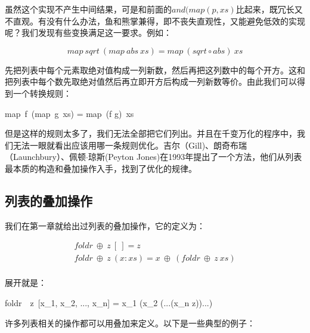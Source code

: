 \documentclass[b5paper]{ctexart}
\begin{document}
虽然这个实现不产生中间结果，可是和前面的$and(map(p, xs)$比起来，既冗长又不直观。有没有什么办法，鱼和熊掌兼得，即不丧失直观性，又能避免低效的实现呢？我们发现有些变换满足这一要求。例如：

\[
map\ sqrt\  (map\ abs\ xs) = map\ (sqrt \circ abs)\ xs
\]

先把列表中每个元素取绝对值构成一列新数，然后再把这列数中的每个开方。这和把列表中每个数先取绝对值然后再立即开方后构成一列新数等价。由此我们可以得到一个转换规则：

\be
map\ f\ (map\ g\ xs) = map\ (f \circ g)\ xs
\ee

但是这样的规则太多了，我们无法全部把它们列出。并且在千变万化的程序中，我们无法一眼就看出应该用哪一条规则优化。吉尔（Gill)、朗奇布瑞（Launchbury）、佩顿$\cdot$琼斯(Peyton Jones)在1993年提出了一个方法，他们从列表最本质的构造和叠加操作入手，找到了优化的规律。

\subsection{列表的叠加操作}

我们在第一章就给出过列表的叠加操作，它的定义为：

\[
\begin{array}{l}
foldr\ \oplus\ z\ [\ ] = z \\
foldr\ \oplus\ z\ (x:xs) = x\ \oplus\ (foldr\ \oplus\ z\ xs) \\
\end{array}
\]

展开就是：

\be
foldr\ \oplus\ z\ [x_1, x_2, ..., x_n] = x_1 \oplus (x_2 \oplus (...(x_n \oplus z))...)
\ee

许多列表相关的操作都可以用叠加来定义。以下是一些典型的例子：
\end{document}
